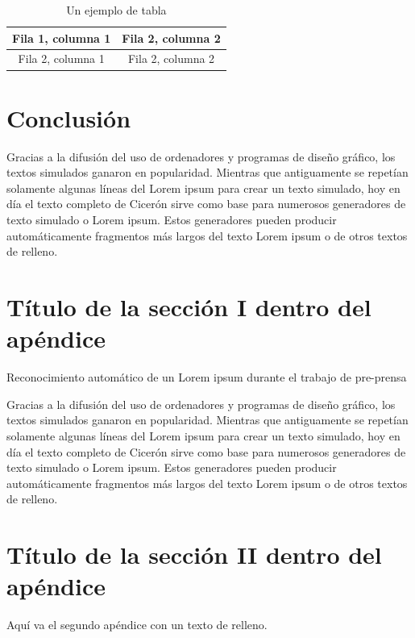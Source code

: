 \documentclass[journal]{IEEEtran} %
\begin{document}
%
\begin{table}
  \renewcommand{\arraystretch}{1.3}
  \caption{Un ejemplo de tabla}
  \label{Etiqueta para el ejemplo de tabla}
  \centering
  \begin{tabular}{|c||c|}
    \hline
      Fila 1, columna 1 & Fila 2, columna 2\\
    \hline
      Fila 2, columna 1 & Fila 2, columna 2\\
    \hline
  \end{tabular}
\end{table}


\section{Conclusión}
Gracias a la difusión del uso de ordenadores y programas de diseño gráfico, los textos simulados ganaron en popularidad. Mientras que antiguamente se repetían solamente algunas líneas del Lorem ipsum para crear un texto simulado, hoy en día el texto completo de Cicerón sirve como base para numerosos generadores de texto simulado o Lorem ipsum. Estos generadores pueden producir automáticamente fragmentos más largos del texto Lorem ipsum o de otros textos de relleno.

\appendices
\section{Título de la sección I dentro del apéndice}
Reconocimiento automático de un Lorem ipsum durante el trabajo de pre-prensa

Gracias a la difusión del uso de ordenadores y programas de diseño gráfico, los textos simulados ganaron en popularidad. Mientras que antiguamente se repetían solamente algunas líneas del Lorem ipsum para crear un texto simulado, hoy en día el texto completo de Cicerón sirve como base para numerosos generadores de texto simulado o Lorem ipsum. Estos generadores pueden producir automáticamente fragmentos más largos del texto Lorem ipsum o de otros textos de relleno.

\section{Título de la sección II dentro del apéndice}
Aquí va el segundo apéndice con un texto de relleno.
\end{document}
